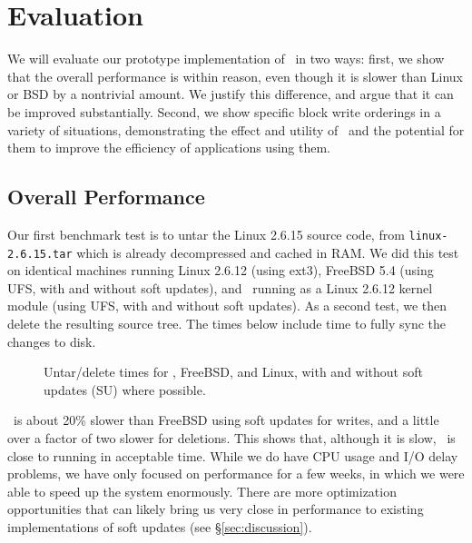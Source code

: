 \section {Evaluation}
\label{sec:evaluation}

We will evaluate our prototype implementation of \Kudos\ in two ways: first, we
show that the overall performance is within reason, even though it is slower
than Linux or BSD by a nontrivial amount. We justify this difference, and argue
that it can be improved substantially. Second, we show specific block write
orderings in a variety of situations, demonstrating the effect and utility of
\opgroups\ and the potential for them to improve the efficiency of applications
using them.

\subsection {Overall Performance}

Our first benchmark test is to untar the Linux 2.6.15 source code, from
\texttt{linux-2.6.15.tar} which is already decompressed and cached in RAM. We
did this test on identical machines running Linux 2.6.12 (using ext3), FreeBSD
5.4 (using UFS, with and without soft updates), and \Kudos\ running as a Linux
2.6.12 kernel module (using UFS, with and without soft updates). As a second
test, we then delete the resulting source tree. The times below include time to
fully sync the changes to disk.

\begin{figure}[htb]
\caption{\label{fig:macro} Untar/delete times for \Kudos, FreeBSD, and Linux,
with and without soft updates (SU) where possible.}
\end{figure}

\Kudos\ is about 20\% slower than FreeBSD using soft updates for
writes, and a little over a factor of two slower for deletions. This
shows that, although it is slow, \Kudos\ is close to running in
acceptable time. While we do have CPU usage and I/O delay problems, we
have only focused on performance for a few weeks, in which we were
able to speed up the system enormously.  There are more optimization
opportunities that can likely bring us very close in performance to
existing implementations of soft updates (see \S\ref{sec:discussion}).

